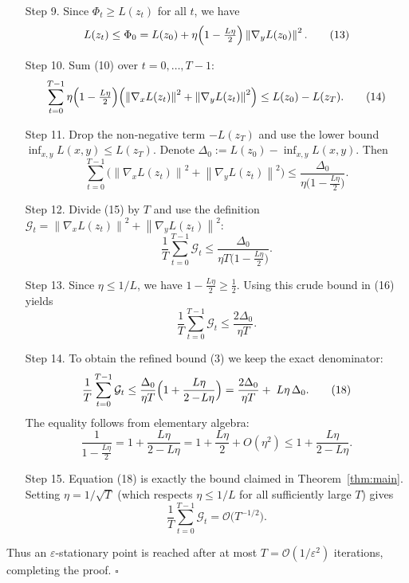 \documentclass{article}
\newcommand{\norm}[1]{\left\| #1 \right\|}
\begin{document}
\begin{enumerate}
\item[Step 9.]  Since \(\Phi_t\ge L(z_t)\) for all \(t\), we have
\[
L(z_t)\le \Phi_0
= L(z_0)+\eta\Bigl(1-\tfrac{L\eta}{2}\Bigr)\norm{\nabla_y L(z_0)}^{2}.
\tag{13}
\]

\item[Step 10.]  Sum (10) over \(t=0,\dots,T-1\):
\[
\sum_{t=0}^{T-1}
\eta\Bigl(1-\tfrac{L\eta}{2}\Bigr)
\Bigl(\norm{\nabla_x L(z_t)}^{2}
+\norm{\nabla_y L(z_t)}^{2}\Bigr)
\le L(z_0)-L(z_T).
\tag{14}
\]

\item[Step 11.]  Drop the non‑negative term \(-L(z_T)\) and use the lower bound
\(\inf_{x,y}L(x,y)\le L(z_T)\). Denote
\(\Delta_0:=L(z_0)-\inf_{x,y}L(x,y)\). Then
\[
\sum_{t=0}^{T-1}
\bigl(\norm{\nabla_x L(z_t)}^{2}
+\norm{\nabla_y L(z_t)}^{2}\bigr)
\le
\frac{\Delta_0}{\eta\bigl(1-\tfrac{L\eta}{2}\bigr)}.
\tag{15}
\]

\item[Step 12.]  Divide (15) by \(T\) and use the definition
\(\mathcal{G}_t=\norm{\nabla_x L(z_t)}^{2}+\norm{\nabla_y L(z_t)}^{2}\):
\[
\frac{1}{T}\sum_{t=0}^{T-1}\mathcal{G}_t
\le
\frac{\Delta_0}{\eta T\bigl(1-\tfrac{L\eta}{2}\bigr)}.
\tag{16}
\]

\item[Step 13.]  Since \(\eta\le 1/L\), we have
\(1-\tfrac{L\eta}{2}\ge \tfrac{1}{2}\). Using this crude bound in (16) yields
\[
\frac{1}{T}\sum_{t=0}^{T-1}\mathcal{G}_t
\le
\frac{2\Delta_0}{\eta T}.
\tag{17}
\]

\item[Step 14.]  To obtain the refined bound (3) we keep the exact denominator:
\[
\frac{1}{T}\sum_{t=0}^{T-1}\mathcal{G}_t
\le
\frac{\Delta_0}{\eta T}
\Bigl(1+\frac{L\eta}{2-\!L\eta}\Bigr)
=
\frac{2\Delta_0}{\eta T}
+\;L\eta\,\Delta_0.
\tag{18}
\]
The equality follows from elementary algebra:
\[
\frac{1}{1-\tfrac{L\eta}{2}}=1+\frac{L\eta}{2-L\eta}
=1+\frac{L\eta}{2}+O(\eta^{2})\le 1+\frac{L\eta}{2-L\eta}.
\]

\item[Step 15.]  Equation (18) is exactly the bound claimed in Theorem~\ref{thm:main}.
Setting \(\eta=1/\sqrt{T}\) (which respects \(\eta\le1/L\) for all sufficiently large \(T\)) gives
\[
\frac{1}{T}\sum_{t=0}^{T-1}\mathcal{G}_t
= \mathcal{O}\!\bigl(T^{-1/2}\bigr).
\tag{19}
\]
\end{enumerate}
Thus an \(\varepsilon\)-stationary point is reached after at most
\(T=\mathcal{O}(1/\varepsilon^{2})\) iterations, completing the proof. \(\square\)
\end{document}
